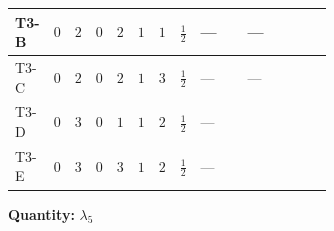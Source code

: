 \documentclass[8pt]{article}
\begin{document}
\begin{landscape}
\begin{longtable}{@{}llcccccc >{\raggedright\arraybackslash}p{0.21\linewidth} >{\raggedright\arraybackslash}p{0.21\linewidth} >{\raggedright\arraybackslash}p{0.21\linewidth}@{}}
\midrule
T3-B & $0$ & $2$ & $0$ & $2$ & $1$ & $1$ & $\frac{1}{2}$ & --- & --- & \scriptsize\adjustbox{max width=\linewidth}{$\begin{gathered} -\frac{9 {g_1}^2 {\lambda_5}}{2}\end{gathered}$} \\
\midrule
T3-C & $0$ & $2$ & $0$ & $2$ & $1$ & $3$ & $\frac{1}{2}$ & --- & --- & \scriptsize\adjustbox{max width=\linewidth}{$\begin{gathered} -\frac{9 {g_1}^2 {\lambda_5}}{2}\end{gathered}$} \\
\midrule
T3-D & $0$ & $3$ & $0$ & $1$ & $1$ & $2$ & $\frac{1}{2}$ & --- & \scriptsize\adjustbox{max width=\linewidth}{$\begin{gathered} -\frac{21 {g_2}^2 {\lambda_5}}{2}\end{gathered}$} & \scriptsize\adjustbox{max width=\linewidth}{$\begin{gathered} -\frac{9 {g_1}^2 {\lambda_5}}{2}\end{gathered}$} \\
\midrule
T3-E & $0$ & $3$ & $0$ & $3$ & $1$ & $2$ & $\frac{1}{2}$ & --- & \scriptsize\adjustbox{max width=\linewidth}{$\begin{gathered} -\frac{33 {g_2}^2 {\lambda_5}}{2}\end{gathered}$} & \scriptsize\adjustbox{max width=\linewidth}{$\begin{gathered} -\frac{9 {g_1}^2 {\lambda_5}}{2}\end{gathered}$} \\
\midrule
\bottomrule
\end{longtable}
\clearpage
\noindent\textbf{Quantity: }$\lambda_5$\par\smallskip

\end{landscape}
\end{document}
